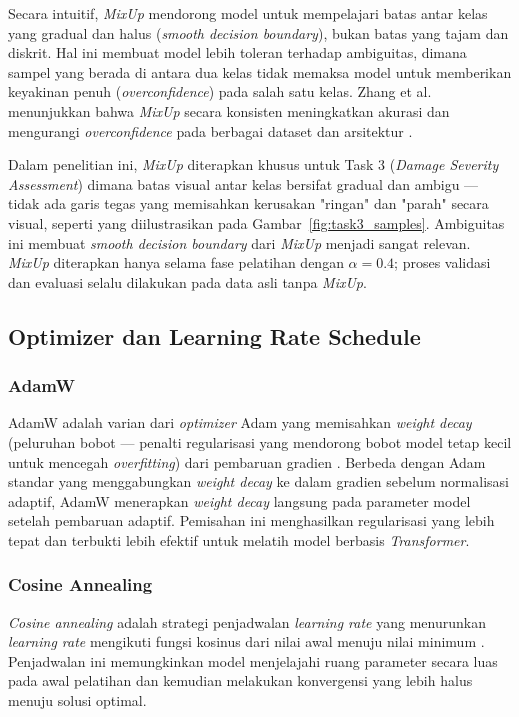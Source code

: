 Secara intuitif, \textit{MixUp} mendorong model untuk mempelajari
batas antar kelas yang gradual dan halus (\textit{smooth decision
boundary}), bukan batas yang tajam dan diskrit. Hal ini membuat model
lebih toleran terhadap ambiguitas, dimana sampel yang berada di antara
dua kelas tidak memaksa model untuk memberikan keyakinan penuh
(\textit{overconfidence}) pada salah satu kelas. Zhang et al.
menunjukkan bahwa \textit{MixUp} secara konsisten meningkatkan akurasi
dan mengurangi \textit{overconfidence} pada berbagai dataset dan
arsitektur \cite{zhang2018mixup}. \par

Dalam penelitian ini, \textit{MixUp} diterapkan khusus untuk Task 3
(\textit{Damage Severity Assessment}) dimana batas visual antar kelas
bersifat gradual dan ambigu — tidak ada garis tegas yang memisahkan
kerusakan "ringan" dan "parah" secara visual, seperti yang diilustrasikan
pada Gambar~\ref{fig:task3_samples}. Ambiguitas ini membuat
\textit{smooth decision boundary} dari \textit{MixUp} menjadi sangat
relevan. \textit{MixUp} diterapkan hanya selama fase pelatihan dengan
$\alpha = 0.4$; proses validasi dan evaluasi selalu dilakukan pada data
asli tanpa \textit{MixUp}. \par


\subsection{Optimizer dan Learning Rate Schedule}
\label{II.Teori.Optimizer}

\subsubsection{AdamW}
AdamW adalah varian dari \textit{optimizer} Adam yang memisahkan
\textit{weight decay} (peluruhan bobot — penalti regularisasi yang
mendorong bobot model tetap kecil untuk mencegah \textit{overfitting})
dari pembaruan gradien \cite{loshchilov2019adamw}. Berbeda dengan Adam
standar yang menggabungkan \textit{weight decay} ke dalam gradien
sebelum normalisasi adaptif, AdamW menerapkan \textit{weight decay}
langsung pada parameter model setelah pembaruan adaptif. Pemisahan ini
menghasilkan regularisasi yang lebih tepat dan terbukti lebih efektif
untuk melatih model berbasis \textit{Transformer}. \par

\subsubsection{Cosine Annealing}
\textit{Cosine annealing} adalah strategi penjadwalan \textit{learning
rate} yang menurunkan \textit{learning rate} mengikuti fungsi kosinus
dari nilai awal menuju nilai minimum \cite{loshchilov2017sgdr}.
Penjadwalan ini memungkinkan model menjelajahi ruang parameter secara
luas pada awal pelatihan dan kemudian melakukan konvergensi yang lebih
halus menuju solusi optimal. \par



